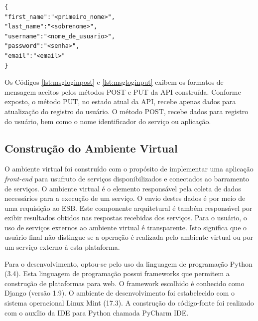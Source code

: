 
\begin{lstlisting}[caption={Formato de mensagem recebido pelo serviço de gerenciamento de usuários (método PUT).},label={lst:msgloginput}]
{
"first_name":"<primeiro_nome>",
"last_name":"<sobrenome>",
"username":"<nome_de_usuario>",
"password":"<senha>",
"email":"<email>"
}
\end{lstlisting}

Os Códigos \ref{lst:msgloginpost} e \ref{lst:msgloginput} exibem os formatos de mensagem aceitos pelos métodos POST e PUT da API construída. Conforme exposto, o método PUT, no estado atual da API, recebe apenas dados para atualização do registro do usuário. O método POST, recebe dados para registro do usuário, bem como o nome identificador do serviço ou aplicação.

\subsection{Construção do Ambiente Virtual}
O ambiente virtual foi construído com o propósito de implementar uma aplicação \textit{front-end} para usufruto de serviços disponibilizados e conectados ao barramento de serviços. O ambiente virtual é o elemento responsável pela coleta de dados necessários para a execução de um serviço. O envio destes dados é por meio de uma requisição ao ESB. Este componente arquitetural é também responsável por exibir resultados obtidos nas respostas recebidas dos serviços. Para o usuário, o uso de serviços externos ao ambiente virtual é transparente. Isto significa que o usuário final não distingue se a operação é realizada pelo ambiente virtual ou por um serviço externo à esta plataforma.

Para o desenvolvimento, optou-se pelo uso da linguagem de programação Python (3.4). Esta linguagem de programação possui frameworks que permitem a construção de plataformas para web. O framework escolhido é conhecido como Django (versão 1.9). O ambiente de desenvolvimento foi estabelecido com o sistema operacional Linux Mint (17.3). A construção do código-fonte foi realizado com o auxílio da IDE para Python chamada PyCharm IDE.

